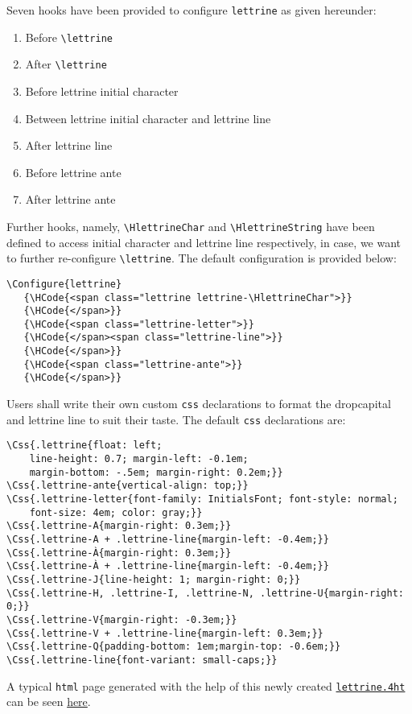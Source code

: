 \documentclass[a4paper]{article}
\let\hlink\href
\begin{document}
Seven \texht hooks have been provided to configure \Verb=lettrine= as
given hereunder:
\begin{enumerate}
\item Before \Verb=\lettrine=
\item After  \Verb=\lettrine=
\item Before lettrine initial character
\item Between lettrine initial character and lettrine line
\item After lettrine line
\item Before lettrine ante
\item After lettrine ante
\end{enumerate}
Further hooks, namely, \Verb=\HlettrineChar= and
\Verb=\HlettrineString= have been defined to access initial character
and lettrine line respectively, in case, we want to further
re-configure \Verb=\lettrine=.  The default configuration is provided
below:
\begin{verbatim}
\Configure{lettrine}
   {\HCode{<span class="lettrine lettrine-\HlettrineChar">}}
   {\HCode{</span>}}
   {\HCode{<span class="lettrine-letter">}}
   {\HCode{</span><span class="lettrine-line">}}
   {\HCode{</span>}}
   {\HCode{<span class="lettrine-ante">}}
   {\HCode{</span>}}
\end{verbatim}
Users shall write their own custom \Verb=css= declarations to format the
dropcapital and lettrine line to suit their taste. The default
\Verb=css= declarations are:
\begin{verbatim}
\Css{.lettrine{float: left;
    line-height: 0.7; margin-left: -0.1em;
    margin-bottom: -.5em; margin-right: 0.2em;}}
\Css{.lettrine-ante{vertical-align: top;}}
\Css{.lettrine-letter{font-family: InitialsFont; font-style: normal;
    font-size: 4em; color: gray;}}
\Css{.lettrine-A{margin-right: 0.3em;}}
\Css{.lettrine-A + .lettrine-line{margin-left: -0.4em;}}
\Css{.lettrine-À{margin-right: 0.3em;}}
\Css{.lettrine-À + .lettrine-line{margin-left: -0.4em;}}
\Css{.lettrine-J{line-height: 1; margin-right: 0;}}
\Css{.lettrine-H, .lettrine-I, .lettrine-N, .lettrine-U{margin-right: 0;}}
\Css{.lettrine-V{margin-right: -0.3em;}}
\Css{.lettrine-V + .lettrine-line{margin-left: 0.3em;}}
\Css{.lettrine-Q{padding-bottom: 1em;margin-top: -0.6em;}}
\Css{.lettrine-line{font-variant: small-caps;}}
\end{verbatim}

A typical \Verb=html= page generated with the help of this newly
created
\hlink{http://download.river-valley.com/tex4ht/lettrine/lettrine.4ht}
{\Verb=lettrine.4ht=} can be seen
\hlink{http://download.river-valley.com/tex4ht/lettrine/ltrn-test.html}{here}.
\end{document}
